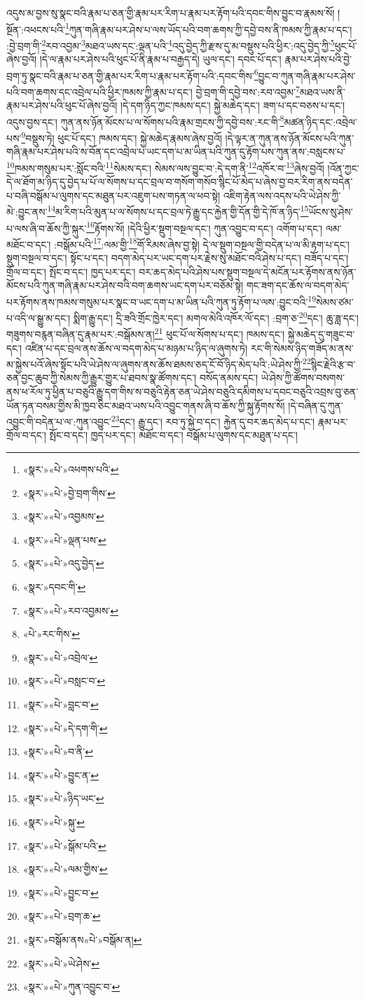 འདུས་མ་བྱས་སུ་སྣང་བའི་རྣམ་པ་ཅན་གྱི་རྣམ་པར་རིག་པ་རྣམ་པར་རྟོག་པའི་དབང་གིས་བྱུང་བ་རྣམས་སོ། །སྔོན་:འཕངས་པའི་\footnote{«སྣར་»«པེ་»འཕགས་པའི་}ཀུན་གཞི་རྣམ་པར་ཤེས་པ་ལས་ཡོད་པའི་བག་ཆགས་ཀྱི་དབྱེ་བས་ནི་ཁམས་ཀྱི་རྣམ་པ་དང་། :བྱེ་བྲག་གི་\footnote{«སྣར་»«པེ་»བྱེ་བྲག་གིས་}རབ་འབྱམ་\footnote{«སྣར་»«པེ་»འབྱམས་}མཐའ་ཡས་དང་:ལྡན་པའི་\footnote{«སྣར་»«པེ་»ལྡན་པས་}འདུ་བྱེད་ཀྱི་རྫས་དུ་མ་བསྡུས་པའི་ཕྱིར་:འདུ་བྱེད་ཀྱི་\footnote{«སྣར་»«པེ་»འདུ་བྱེད་}ཕུང་པོ་ཞེས་བྱའོ། །དེ་ལ་རྣམ་པར་ཤེས་པའི་ཕུང་པོ་ནི་རྣམ་པ་བརྒྱད་དེ། ཡུལ་དང་། དབང་པོ་དང་། རྣམ་པར་ཤེས་པའི་བྱེ་བྲག་ཏུ་སྣང་བའི་རྣམ་པ་ཅན་གྱི་རྣམ་པར་རིག་པ་རྣམ་པར་རྟོག་པའི་:དབང་གིས་\footnote{«སྣར་»དབང་གི་}བྱུང་བ་ཀུན་གཞི་རྣམ་པར་ཤེས་པའི་བག་ཆགས་དང་འབྲེལ་པའི་ཕྱིར་ཁམས་ཀྱི་རྣམ་པ་དང་། བྱེ་བྲག་གི་དབྱེ་བས་:རབ་འབྱམ་\footnote{«སྣར་»«པེ་»རབ་འབྱམས་}མཐའ་ཡས་ནི་རྣམ་པར་ཤེས་པའི་ཕུང་པོ་ཞེས་བྱའོ། །དེ་དག་ཉིད་ཀྱང་ཁམས་དང་། སྐྱེ་མཆེད་དང་། ཟག་པ་དང་བཅས་པ་དང་། འདུས་བྱས་དང་། ཀུན་ནས་ཉོན་མོངས་པ་ལ་སོགས་པའི་རྣམ་གྲངས་ཀྱི་དབྱེ་བས་:རང་གི་\footnote{«པེ་»རང་གིས་}མཚན་ཉིད་དང་:འབྲེལ་པས་\footnote{«སྣར་»«པེ་»འབྲེལ་}བསྡུས་ཏེ། ཕུང་པོ་དང་། ཁམས་དང་། སྐྱེ་མཆེད་རྣམས་ཞེས་བྱའོ། །དེ་ལྟར་ན་ཀུན་ནས་ཉོན་མོངས་པའི་ཀུན་གཞི་རྣམ་པར་ཤེས་པའི་ས་བོན་དང་འབྲེལ་པ་ཡང་དག་པ་མ་ཡིན་པའི་ཀུན་དུ་རྟོག་པས་ཀུན་ནས་:བསླངས་པ་\footnote{«སྣར་»«པེ་»བསླང་བ་}ཁམས་གསུམ་པར་:སློང་བའི་\footnote{«སྣར་»«པེ་»བླང་བ་}སེམས་དང་། སེམས་ལས་བྱུང་བ་:དེ་དག་ནི་\footnote{«སྣར་»«པེ་»དེ་དག་གི་}འཁོར་བ་\footnote{«སྣར་»«པེ་»བ་ནི་}ཞེས་བྱའོ། །འོན་ཀྱང་དེ་ལ་ཐོག་མ་ཉིད་དུ་བྱེད་པ་པོ་ལ་སོགས་པ་དང་བྲལ་བ་གསོག་གསོབ་སྙིང་པོ་མེད་པ་ཞེས་བྱ་བར་རིག་ནས་བདེན་པ་བཞི་བསྒོམ་པ་ལུགས་དང་མཐུན་པར་འཇུག་པས་གཏན་ལ་ཕབ་སྟེ། འཇིག་རྟེན་ལས་འདས་པའི་ཡེ་ཤེས་ཀྱི་མེ་:བྱུང་ནས་\footnote{«སྣར་»«པེ་»བྱུང་ན་}མ་རིག་པའི་མུན་པ་ལ་སོགས་པ་དང་བྲལ་ཏེ་རྒྱུ་དང་རྐྱེན་གྱི་དོན་གྱི་དེ་ཁོ་ན་ཉིད་\footnote{«སྣར་»«པེ་»ཉིད་ཡང་}ཡོངས་སུ་ཤེས་པ་ལས་ཞི་བ་ཆོས་ཀྱི་སྐུར་\footnote{«སྣར་»«པེ་»སྐུ་}རྟོགས་སོ། །དེའི་ཕྱིར་སྡུག་བསྔལ་དང་། ཀུན་འབྱུང་བ་དང་། འགོག་པ་དང་། ལམ་མཐོང་བ་དང་། :བསྒོམ་པའི་\footnote{«སྣར་»«པེ་»སྒོམ་པའི་}:ལམ་གྱི་\footnote{«སྣར་»«པེ་»ལམ་གྱིས་}གོ་རིམས་ཞེས་བྱ་སྟེ། དེ་ལ་སྡུག་བསྔལ་གྱི་བདེན་པ་ལ་མི་རྟག་པ་དང་། སྡུག་བསྔལ་བ་དང་། སྟོང་པ་དང་། བདག་མེད་པར་ཡང་དག་པར་རྗེས་སུ་མཐོང་བའི་ཤེས་པ་དང་། བཟོད་པ་དང་། གྲོལ་བ་དང་། སྤོང་བ་དང་། ཁྱད་པར་དང་། བར་ཆད་མེད་པའི་ཤེས་པས་སྡུག་བསྔལ་དེ་མངོན་པར་རྟོགས་ནས་ཉོན་མོངས་པའི་ཀུན་གཞི་རྣམ་པར་ཤེས་བའི་བག་ཆགས་ཡང་དག་པར་བཅོམ་སྟེ། གང་ཟག་དང་ཆོས་ལ་བདག་མེད་པར་རྟོགས་ནས་ཁམས་གསུམ་པར་སྣང་བ་ཡང་དག་པ་མ་ཡིན་པའི་ཀུན་ཏུ་རྟོག་པ་ལས་:བྱུང་བའི་\footnote{«སྣར་»«པེ་»བྱུང་བ་}སེམས་ཙམ་པ་འདི་ལ་སྒྱུ་མ་དང་། སྨིག་རྒྱུ་དང་། དྲི་ཟའི་གྲོང་ཁྱེར་དང་། མགལ་མེའི་འཁོར་ལོ་དང་། :བྲག་ཅ་\footnote{«སྣར་»«པེ་»བྲག་ཆ་}དང་། ཆུ་ཟླ་དང་། གཟུགས་བརྙན་བཞིན་དུ་རྣམ་པར་:བསྒོམས་ན།\footnote{«སྣར་»བསྒོམ་ནས«པེ་»བསྒོམ་ན།} ཕུང་པོ་ལ་སོགས་པ་དང་། ཁམས་དང་། སྐྱེ་མཆེད་དུ་གཟུང་བ་དང་། འཛིན་པ་དང་བྲལ་ནས་ཆོས་ལ་བདག་མེད་པ་མཉམ་པ་ཉིད་ལ་ཞུགས་ཏེ། རང་གི་སེམས་ཉིད་གཟོད་མ་ནས་མ་སྐྱེས་པའོ་ཞེས་སྟོང་པའི་ཡེ་ཤེས་ལ་ཞུགས་ནས་ཆོས་ཐམས་ཅད་ངོ་བོ་ཉིད་མེད་པའི་:ཡེ་ཤེས་ཀྱི་\footnote{«སྣར་»«པེ་»ཡེ་ཤེས་}སྙིང་རྗེའི་རྩ་བ་ཅན་བྱང་ཆུབ་ཀྱི་སེམས་ཀྱི་རྒྱུར་གྱུར་པ་ཐབས་སྣ་ཚོགས་དང་། བསོད་ནམས་དང་། ཡེ་ཤེས་ཀྱི་ཚོགས་བསགས་ནས་ཕ་རོལ་ཏུ་ཕྱིན་པ་བཅུའི་རྒྱུ་དག་གིས་ས་བཅུའི་རྟེན་ཅན་ཡེ་ཤེས་བཅུའི་དམིགས་པ་དབང་བཅུའི་འབྲས་བུ་ཅན་ཡོན་ཏན་བསམ་གྱིས་མི་ཁྱབ་ཅིང་མཐའ་ཡས་པའི་འབྱུང་གནས་ཞི་བ་ཆོས་ཀྱི་སྐུ་རྟོགས་སོ། །དེ་བཞིན་དུ་ཀུན་འབྱུང་གི་བདེན་པ་ལ་:ཀུན་འབྱུང་\footnote{«སྣར་»«པེ་»ཀུན་འབྱུང་བ་}དང་། རྒྱུ་དང་། རབ་ཏུ་སྐྱེ་བ་དང་། རྐྱེན་དུ་བར་ཆད་མེད་པ་དང་། རྣམ་པར་གྲོལ་བ་དང་། སྤོང་བ་དང་། ཁྱད་པར་དང་། མཐོང་བ་དང་། བསྒོམ་པ་ལུགས་དང་མཐུན་པ་དང་། 